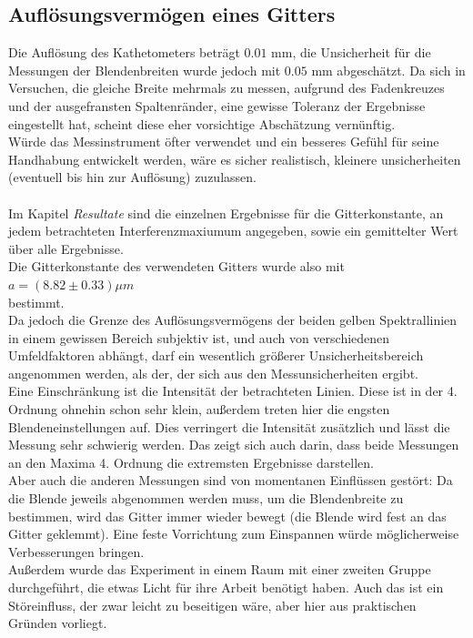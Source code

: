 \documentclass[12pt,a4paper]{article}
\begin{document}
\begin{multicols}{2}
\subsection{Auflösungsvermögen eines Gitters}

Die Auflösung des Kathetometers beträgt $0.01$ mm, die Unsicherheit für die Messungen der Blendenbreiten wurde jedoch mit $0.05$ mm abgeschätzt. Da sich in Versuchen, die gleiche Breite mehrmals zu messen, aufgrund des Fadenkreuzes und der ausgefransten Spaltenränder, eine gewisse Toleranz der Ergebnisse eingestellt hat, scheint diese eher vorsichtige Abschätzung vernünftig.\\
Würde das Messinstrument öfter verwendet und ein besseres Gefühl für seine Handhabung entwickelt werden, wäre es sicher realistisch, kleinere unsicherheiten (eventuell bis hin zur Auflösung) zuzulassen.\\
\\
Im Kapitel \emph{Resultate} sind die einzelnen Ergebnisse für die Gitterkonstante, an jedem betrachteten Interferenzmaxiumum angegeben, sowie ein gemittelter Wert über alle Ergebnisse.\\
Die Gitterkonstante des verwendeten Gitters wurde also mit \\
$a=(8.82 \pm 0.33)\mu m$\\
bestimmt.\\
Da jedoch die Grenze des Auflösungsvermögens der beiden gelben Spektrallinien in einem gewissen Bereich subjektiv ist, und auch von verschiedenen Umfeldfaktoren abhängt, darf ein wesentlich größerer Unsicherheitsbereich angenommen werden, als der, der sich aus den Messunsicherheiten ergibt.\\
Eine Einschränkung ist die Intensität der betrachteten Linien. Diese ist in der 4. Ordnung ohnehin schon sehr klein, außerdem treten hier die engsten Blendeneinstellungen auf. Dies verringert die Intensität zusätzlich und lässt die Messung sehr schwierig werden. Das zeigt sich auch darin, dass beide Messungen an den Maxima 4. Ordnung die extremsten Ergebnisse darstellen.\\
Aber auch die anderen Messungen sind von momentanen Einflüssen gestört: Da die Blende jeweils abgenommen werden muss, um die Blendenbreite zu bestimmen, wird das Gitter immer wieder bewegt (die Blende wird fest an das Gitter geklemmt). Eine feste Vorrichtung zum Einspannen würde möglicherweise Verbesserungen bringen.\\
Außerdem wurde das Experiment in einem Raum mit einer zweiten Gruppe durchgeführt, die etwas Licht für ihre Arbeit benötigt haben. Auch das ist ein Störeinfluss, der zwar leicht zu beseitigen wäre, aber hier aus praktischen Gründen vorliegt.\\

\end{multicols}
\end{document}
